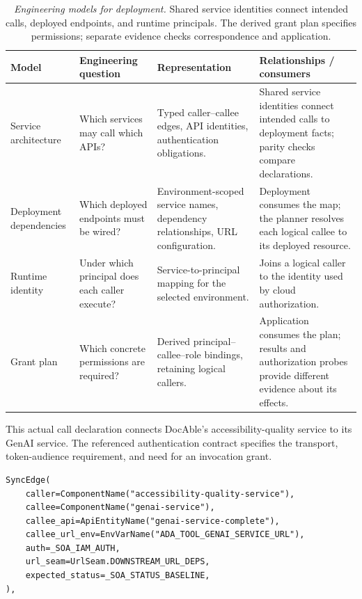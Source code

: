 {\footnotesize
\begin{longtable}{@{}p{.18\linewidth}p{.22\linewidth}p{.25\linewidth}p{.27\linewidth}@{}}
\caption[Engineering models for deployment]{\emph{Engineering models for deployment.} Shared service identities connect intended calls, deployed endpoints, and runtime principals. The derived grant plan specifies permissions; separate evidence checks correspondence and application.}\label{handbook-deployment-models}\\
\toprule
\textbf{Model} & \textbf{Engineering question} & \textbf{Representation} & \textbf{Relationships / consumers} \\
\midrule\endhead
Service architecture & Which services may call which APIs? & Typed caller--callee edges, API identities, authentication obligations. & Shared service identities connect intended calls to deployment facts; parity checks compare declarations. \\
Deployment dependencies & Which deployed endpoints must be wired? & Environment-scoped service names, dependency relationships, URL configuration. & Deployment consumes the map; the planner resolves each logical callee to its deployed resource. \\
Runtime identity & Under which principal does each caller execute? & Service-to-principal mapping for the selected environment. & Joins a logical caller to the identity used by cloud authorization. \\
Grant plan & Which concrete permissions are required? & Derived principal--callee--role bindings, retaining logical callers. & Application consumes the plan; results and authorization probes provide different evidence about its effects. \\
\bottomrule\end{longtable}
}

This actual call declaration connects DocAble's accessibility-quality service to its GenAI service. The referenced authentication contract specifies the transport, token-audience requirement, and need for an invocation grant.

\begin{verbatim}
SyncEdge(
    caller=ComponentName("accessibility-quality-service"),
    callee=ComponentName("genai-service"),
    callee_api=ApiEntityName("genai-service-complete"),
    callee_url_env=EnvVarName("ADA_TOOL_GENAI_SERVICE_URL"),
    auth=_SOA_IAM_AUTH,
    url_seam=UrlSeam.DOWNSTREAM_URL_DEPS,
    expected_status=_SOA_STATUS_BASELINE,
),
\end{verbatim}

